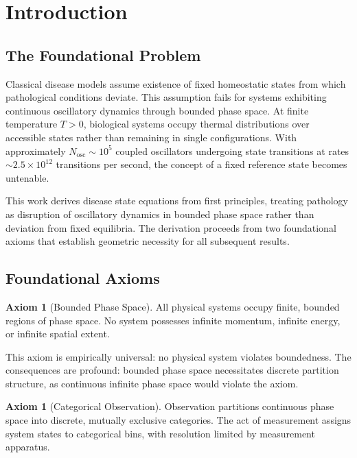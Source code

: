 \documentclass[12pt,a4paper]{article}
\theoremstyle{definition}
\newtheorem{axiom}[theorem]{Axiom}
\theoremstyle{remark}
\begin{document}
\tableofcontents
\newpage

\section{Introduction}
\label{sec:introduction}

\subsection{The Foundational Problem}

Classical disease models assume existence of fixed homeostatic states from which pathological conditions deviate. This assumption fails for systems exhibiting continuous oscillatory dynamics through bounded phase space. At finite temperature $T > 0$, biological systems occupy thermal distributions over accessible states rather than remaining in single configurations. With approximately $N_{\mathrm{osc}} \sim 10^5$ coupled oscillators undergoing state transitions at rates $\sim 2.5 \times 10^{12}$ transitions per second, the concept of a fixed reference state becomes untenable.

This work derives disease state equations from first principles, treating pathology as disruption of oscillatory dynamics in bounded phase space rather than deviation from fixed equilibria. The derivation proceeds from two foundational axioms that establish geometric necessity for all subsequent results.

\subsection{Foundational Axioms}

\begin{axiom}[Bounded Phase Space]
\label{ax:bounded}
All physical systems occupy finite, bounded regions of phase space. No system possesses infinite momentum, infinite energy, or infinite spatial extent.
\end{axiom}

This axiom is empirically universal: no physical system violates boundedness. The consequences are profound: bounded phase space necessitates discrete partition structure, as continuous infinite phase space would violate the axiom.

\begin{axiom}[Categorical Observation]
\label{ax:categorical}
Observation partitions continuous phase space into discrete, mutually exclusive categories. The act of measurement assigns system states to categorical bins, with resolution limited by measurement apparatus.
\end{axiom}
\end{document}
